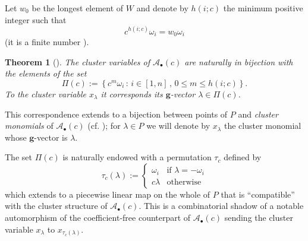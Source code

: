 \documentclass[11pt]{amsart}
\newcommand{\cA}{\mathcal{A}}
\newcommand{\bg}{\mathbf{g}}
\newtheorem{theorem}{Theorem}[section]
\theoremstyle{definition}
\numberwithin{equation}{section}
\numberwithin{figure}{section}
\begin{document}
  Let $w_0$ be the longest element of $W$ and denote by $h(i;c)$ the minimum positive integer such that 
  \[
    c^{h(i;c)}\omega_i = w_0\omega_i
  \]
  (it is a finite number \cite[Proposition 1.3]{YZ08}).
  \begin{theorem}[{\cite[Theorem 1.4]{YZ08}}]
    The cluster variables of $\cA_\bullet(c)$ are naturally in bijection with the elements of the set
    \[
      \Pi(c)
      :=
      \left\{
        c^m\omega_i \, :\, i\in[1,n] \, , \, 0\leq m \leq h(i;c) 
      \right\}.
    \]
    To the cluster variable $x_\lambda$ it corresponds its $\bg$-vector $\lambda\in\Pi(c)$.
  \end{theorem}
  This correspondence extends to a bijection between points of $P$ and \emph{cluster monomials} of $\cA_\bullet(c)$ (cf. \cite[Theorem 1.2]{Ste13}); for $\lambda\in P$ we will denote by $x_\lambda$ the cluster monomial whose $\bg$-vector is $\lambda$.

  The set $\Pi(c)$ is naturally endowed with a permutation $\tau_c$ defined by
  \[
    \tau_c (\lambda) 
    :=
    \begin{cases}
      \omega_i  & \text{if $\lambda = -\omega_i$} \\
      c\lambda  & \text{otherwise}
    \end{cases}
  \]
  which extends to a piecewise linear map on the whole of $P$ that is ``compatible'' with the cluster structure of $\cA_\bullet(c)$.
  This is a combinatorial shadow of a notable automorphism of the coefficient-free counterpart of $\cA_\bullet(c)$ sending the cluster variable $x_\lambda$ to $x_{\tau_c(\lambda)}$. 
\end{document}
